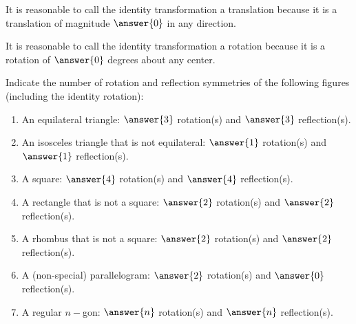 \documentclass[nooutcomes]{ximera}
\begin{document}
\begin{question}
It is reasonable to call the identity transformation a translation because it is a translation of magnitude $\answer{0}$ in any direction.  

It is reasonable to call the identity transformation a rotation because it is a rotation of $\answer{0}$ degrees about any center.  
\end{question}

\begin{question}
Indicate the number of rotation and reflection symmetries of the following figures (including the identity rotation): 
\begin{enumerate}
\item An equilateral triangle: $\answer{3}$ rotation(s) and $\answer{3}$ reflection(s). 
\item An isosceles triangle that is not equilateral: $\answer{1}$ rotation(s) and $\answer{1}$ reflection(s).
\item A square: $\answer{4}$ rotation(s) and $\answer{4}$ reflection(s).
\item A rectangle that is not a square: $\answer{2}$ rotation(s) and $\answer{2}$ reflection(s).
\item A rhombus that is not a square: $\answer{2}$ rotation(s) and $\answer{2}$ reflection(s).
\item A (non-special) parallelogram: $\answer{2}$ rotation(s) and $\answer{0}$ reflection(s).
\item A regular $n-$gon: $\answer{n}$ rotation(s) and $\answer{n}$ reflection(s).
\end{enumerate}
\end{question}

\end{document}
